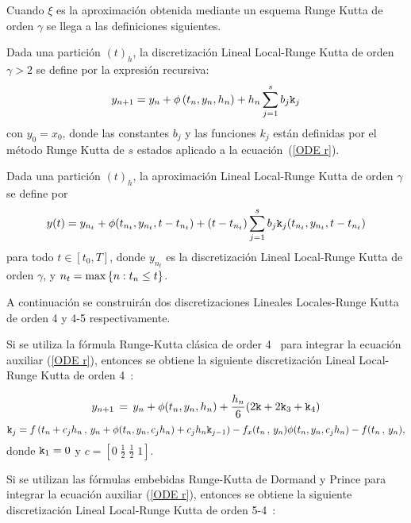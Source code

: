 Cuando $\xi$ es la aproximación obtenida mediante un esquema Runge Kutta de orden $\gamma$ se llega a las definiciones siguientes.
\begin{definition}
	\label{definition HLLD} \cite{Jimenez13} Dada una partición $(t)_{h}$, la discretización Lineal Local-Runge Kutta 
    de orden $\gamma >2$ se define por la expresión recursiva:
	\begin{equation*}
	y_{n+1}=y_{n}+\phi \left( t_{n},y_{n},h_{n}\right) +h_{n}\sum_{j=1}^{s}b_{j}\mathtt{k}_{j}
	\end{equation*}%
	con $y_{0}=x_{0}$, donde las constantes $b_{j}$ y las funciones $k_{j}$ están definidas por el método Runge Kutta de $s$ estados aplicado a la ecuación~(\ref{ODE r}).
\end{definition}

\begin{definition}
	\label{definition HOLLA} \cite{Jimenez13} Dada una partición $(t)_{h}$, la aproximación Lineal Local-Runge Kutta de orden $\gamma$ se define por 
	\begin{equation*}
	y(t)=y_{n_{t}}+\phi(t_{n_{t}},y_{n_{t}},t-t_{n_{t}})+(t-t_{n_{t}})%
	\sum_{j=1}^{s}b_{j}\kt_{j}(t_{n_{t}},y_{n_{t}},t-t_{n_{t}}) %
	\end{equation*}
	para todo $t\in[t_{0},T]$, donde $y_{n_{t}}$ es la discretización Lineal Local-Runge Kutta de orden $\gamma$, y $n_{t}=\max\left\{ n:t_{n}\leq t \right\}$.
\end{definition}
A continuación se construirán dos discretizaciones Lineales Locales-Runge Kutta de orden 4 y 4-5 respectivamente.

Si se utiliza la fórmula Runge-Kutta clásica de order 4~\cite{hairer1993solving} para integrar la ecuación auxiliar (\ref{ODE r}), entonces se obtiene la siguiente discretización Lineal Local-Runge Kutta de orden 4~\cite{Jimenez13}:

\begin{equation}
    y_{n+1}\,=\,y_n+\phi(t_n,y_n,h_n)+\frac{h_n}{6}(2\mathtt{k}+2\mathtt{k}_3+\mathtt{k}_4)
    \label{LLDP scheme}
    \end{equation}
    \[ \mathtt{k}_j = f\left( t_n+c_jh_n\, , \, y_n+\phi(t_n,y_n,c_jh_n)+c_jh_n\mathtt{k}_{j-1} \right)
- f_x(t_n\, , \, y_n)\phi(t_n,y_n,c_jh_n) - f(t_n\, ,\, y_n) ,\]
donde $\mathtt{k}_1=0$ y $c = \left[ 0 \; \frac{1}{2} \; \frac{1}{2} \; 1  \right]$.

Si se utilizan las fórmulas embebidas Runge-Kutta de Dormand y Prince para integrar la ecuación auxiliar (\ref{ODE r}), entonces se obtiene la siguiente discretización Lineal Local-Runge Kutta de orden 5-4~\cite{Jimenez14AMC}:

